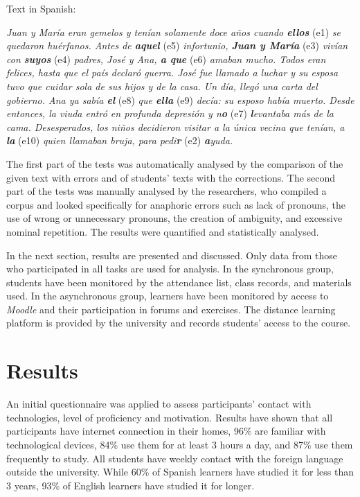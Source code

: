 \documentclass{textolivre}
\begin{document}
\vspace{1ex}
\begin{samepage}
Text in Spanish:

\nopagebreak
\emph{Juan y María eran gemelos y tenían solamente doce años cuando
\textbf{ellos}} (e1) \emph{se quedaron huérfanos. Antes de
\textbf{aquel}} (e5) \emph{infortunio, \textbf{Juan y María}} (e3)
\emph{vivían con \textbf{suyos}} (e4) \emph{padres, José y Ana,
\textbf{a que}} (e6) \emph{amaban mucho. Todos eran felices, hasta que
el país declaró guerra. José fue llamado a luchar y su esposa tuvo que
cuidar sola de sus hijos y de la casa. Un día, llegó una carta del
gobierno. Ana ya sabía \textbf{el}} (e8) \emph{que \textbf{ella}} (e9)
\emph{decía: su esposo había muerto. Desde entonces, la viuda entró en
profunda depresión y n\textbf{o}} (e7) \emph{\textbf{l}evantaba más de
la cama. Desesperados, los niños decidieron visitar a la única vecina
que tenían, a \textbf{la}} (e10) \emph{quien llamaban bruja, para
pedi\textbf{r}} (e2) \emph{\textbf{a}yuda.}
\end{samepage}

The first part of the tests was automatically analysed by the comparison
of the given text with errors and of students' texts with the
corrections. The second part of the tests was manually analysed by the
researchers, who compiled a corpus and looked specifically for anaphoric
errors such as lack of pronouns, the use of wrong or unnecessary
pronouns, the creation of ambiguity, and excessive nominal repetition.
The results were quantified and statistically analysed.

In the next section, results are presented and discussed. Only data from
those who participated in all tasks are used for analysis. In the
synchronous group, students have been monitored by the attendance list,
class records, and materials used. In the asynchronous group, learners
have been monitored by access to \emph{Moodle} and their participation
in forums and exercises. The distance learning platform is provided by
the university and records students' access to the course.


\section{Results}\label{sec-res}
An initial questionnaire was applied to assess participants' contact
with technologies, level of proficiency and motivation. Results have
shown that all participants have internet connection in their homes,
96\% are familiar with technological devices, 84\% use them for at least
3 hours a day, and 87\% use them frequently to study. All students have
weekly contact with the foreign language outside the university. While
60\% of Spanish learners have studied it for less than 3 years, 93\% of
English learners have studied it for longer.
\end{document}

